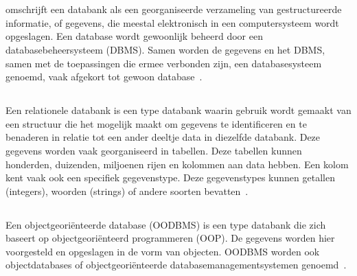 \section{}
\label{sec:PosgreSQL}

\subsection{}
\label{subsec:Databank}

\textcite{Oracle23} omschrijft een databank als een georganiseerde verzameling van gestructureerde informatie, of gegevens, die meestal elektronisch in een computersysteem wordt opgeslagen. Een database wordt gewoonlijk beheerd door een databasebeheersysteem (DBMS). Samen worden de gegevens en het DBMS, samen met de toepassingen die ermee verbonden zijn, een databasesysteem genoemd, vaak afgekort tot gewoon database~\autocite{Oracle23}.

\subsection{}
\label{subsec:Relationele Databank}

Een relationele databank is een type databank waarin gebruik wordt gemaakt van een structuur die het mogelijk maakt om gegevens te identificeren en te benaderen in relatie tot een ander deeltje data in diezelfde databank. Deze gegevens worden vaak georganiseerd in tabellen. Deze tabellen kunnen honderden, duizenden, miljoenen rijen en kolommen aan data hebben. Een kolom kent vaak ook een specifiek gegevenstype. Deze gegevenstypes kunnen getallen (integers), woorden (strings) of andere soorten bevatten~\autocite{Codecademy}.

\subsection{}
\label{subsec:Object-georiënteerde databank}

Een objectgeoriënteerde database (OODBMS) is een type databank die zich baseert op objectgeoriënteerd programmeren (OOP). De gegevens worden hier voorgesteld en opgeslagen in de vorm van objecten. OODBMS worden ook objectdatabases of objectgeoriënteerde databasemanagementsystemen genoemd~\autocite{CCorner2019}. 

